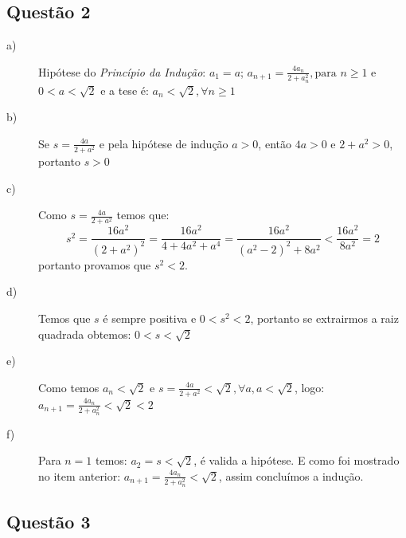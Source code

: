 \documentclass[12pt]{article}
\begin{document}
\subsection*{\color{red} Questão 2}

\begin{description}

\item[a)] Hipótese do \emph{Princípio da Indução}: $a_1=a$; $\displaystyle a_{n+1}  = \frac{4a_n}{2+a_n^2}, \text{para } n\geq 1$ e $0<a<\sqrt{2}$ e a tese é: $a_n<\sqrt{2}, \forall n\geq 1$

\item[b)] Se $\displaystyle s=\frac{4a}{2+a^2}$ e pela hipótese de indução $a>0$, então $4a>0$ e $2+a^2>0$, portanto $s>0$

\item[c)] Como $\displaystyle s=\frac{4a}{2+a^2}$ temos que: $$s^2=\frac{16a^2}{(2+a^2)^2}=\frac{16a^2}{4+4a^2+a^4}=\frac{16a^2}{(a^2-2)^2+8a^2}<\frac{16a^2}{8a^2}=2$$ portanto provamos que $s^2<2$.

\item[d)] Temos que $s$ é sempre positiva e $0<s^2<2$, portanto se extrairmos a raiz quadrada obtemos: $0<s<\sqrt{2}$

\item[e)] Como temos $a_n<\sqrt 2$ e $s=\displaystyle \frac{4a}{2+a^2}<\sqrt 2, \forall a, a<\sqrt 2$, logo: $a_{n+1}=\displaystyle \frac{4a_n}{2+a_n^2}<\sqrt 2<2$

\item[f)] Para $n=1$ temos: $a_2=s<\sqrt 2$, é valida a hipótese. E como foi mostrado no item anterior: $a_{n+1}=\displaystyle \frac{4a_n}{2+a_n^2}<\sqrt 2$, assim concluímos a indução.

\end{description}

\subsection*{\color{red} Questão 3}
\end{document}
